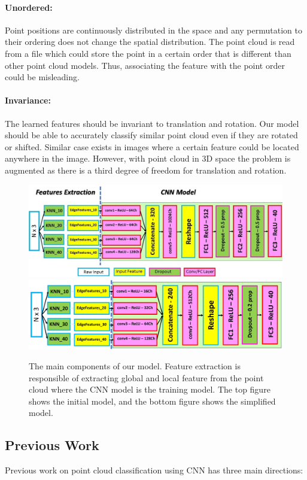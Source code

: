 \paragraph{Unordered:} Point positions are continuously distributed in the space and any permutation to their ordering does not change the spatial distribution. The point cloud is read from a file which could store the point in a certain order that is different than other point cloud models. Thus, associating the feature with the point order could be misleading.
\paragraph{Invariance:} The learned features should be invariant to translation and rotation. Our model should be able to accurately classify similar point cloud even if they are rotated or shifted. Similar case exists in images where a certain feature could be located anywhere in the image. However, with point cloud in 3D space the problem is augmented as there is a third degree of freedom for translation and rotation. 

\begin{figure}[!tbh]
\includegraphics[width=1.0\textwidth]{fig/model1.JPG}
\includegraphics[width=1.0\textwidth]{fig/model2.JPG}
\caption{The main components of our model. Feature extraction is responsible of extracting global and local feature from the point cloud where the CNN model is the training model. The top figure shows the initial model, and the bottom figure shows the simplified model.}
\label{fig:model1}
\end{figure}


\subsection{Previous Work}
Previous work on point cloud classification using CNN has three main directions:
